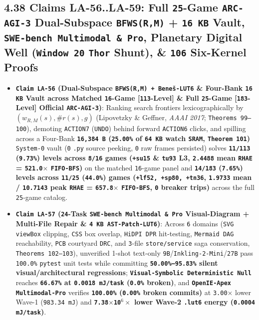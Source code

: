 \documentclass[10pt]{article}
\begin{document}
\subsection{4.38 Claims LA-56..LA-59: Full \texttt{25}-Game \texttt{ARC-AGI-3} Dual-Subspace \texttt{BFWS(R,M)} + \texttt{16 KB} Vault, \texttt{SWE-bench Multimodal \& Pro}, Planetary Digital Well (\texttt{Window 20} \texttt{Thor} Shunt), \& \texttt{106} Six-Kernel Proofs}\label{claim-la56}

\begin{itemize}
  \item \textbf{\texttt{Claim LA-56} (Dual-Subspace \texttt{BFWS(R,M) + Bene\v{s}-LUT6} \& Four-Bank \texttt{16 KB} Vault across Matched \texttt{16}-Game [\texttt{113}-Level] \& Full \texttt{25}-Game [\texttt{183}-Level] Official \texttt{ARC-AGI-3})}: Ranking search frontiers lexicographically by $(w_{R,M}(s), \#r(s), g)$ (Lipovetzky \& Geffner, \emph{AAAI 2017}; \texttt{Theorems 99--100}), demoting \texttt{ACTION7} (\texttt{UNDO}) behind forward \texttt{ACTION6} clicks, and spilling across a Four-Bank \textbf{\texttt{16,384 B} (\texttt{25.00\%} of \texttt{64 KB} watch \texttt{SRAM}, \texttt{Theorem 101})} \texttt{System-0} vault (\texttt{0} \texttt{.py} source peeking, \texttt{0} raw frames persisted) solves \textbf{\texttt{11/113} (\texttt{9.73\%}) levels across \texttt{8/16} games (\texttt{+su15} \& \texttt{tu93} L3, \texttt{2.4488} mean \texttt{RHAE} = \texttt{521.0$\times$} \texttt{FIFO-BFS})} on the matched \texttt{16}-game panel and \textbf{\texttt{14/183} (\texttt{7.65\%}) levels across \texttt{11/25} (\texttt{44.0\%}) games (\texttt{+lf52, +sp80, +tn36}, \texttt{1.9733} mean / \texttt{10.7143} peak \texttt{RHAE} = \texttt{657.8$\times$} \texttt{FIFO-BFS}, \texttt{0} breaker trips)} across the full \texttt{25}-game catalog.
  \item \textbf{\texttt{Claim LA-57} (\texttt{24}-Task \texttt{SWE-bench Multimodal \& Pro} Visual-Diagram + Multi-File Repair \& \texttt{4 KB AST-Patch-LUT6})}: Across \texttt{6} domains (\texttt{SVG viewBox} clipping, \texttt{CSS} box overlap, \texttt{HiDPI DPR} hit-testing, \texttt{Mermaid DAG} reachability, \texttt{PCB} courtyard \texttt{DRC}, and \texttt{3}-file \texttt{store/service} saga conservation, \texttt{Theorems 102--103}), unverified 1-shot text-only \texttt{9B}/\texttt{Inkling-2-Mini}/\texttt{27B} pass \texttt{100.0\%} \texttt{pytest} unit tests while committing \textbf{\texttt{50.00\%--95.83\%} silent visual/architectural regressions}; \textbf{\texttt{Visual-Symbolic Deterministic Null}} reaches \textbf{\texttt{66.67\%} at \texttt{0.0018 mJ/task} (\texttt{0.0\%} broken)}, and \textbf{\texttt{OpenIE-Apex Multimodal-Pro}} verifies \textbf{\texttt{100.00\%} (\texttt{0.00\%} broken commits)} at \texttt{3.00$\times$} lower Wave-1 (\texttt{983.34 mJ}) and \textbf{\texttt{7.38$\times$10$^6\times$} lower Wave-2 \texttt{.lut6} energy (\texttt{0.0004 mJ/task})}.

\end{itemize}
\end{document}
